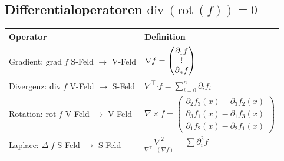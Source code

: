 \documentclass[6pt,a4paper]{scrartcl}
\let\olddot = \dot
\newcommand{\vect}[1]{\ensuremath{\begin{pmatrix} #1 \end{pmatrix}}}                            %
\newcommand{\bdot}{\ensuremath{\boldsymbol \cdot}}                                              %
\newcommand{\svdots}{\ensuremath{\olddot :}}                                                    %
\renewcommand*{\dot}[1]{\accentset{\mbox{\textrm{\large\bfseries .}} }{#1}}                     %
\renewcommand{\div}{\ensuremath{\mathrm{div}\ }}                               %
\newcommand{\rot}{\ensuremath{\mathrm{rot}\ }}                                 %
\begin{document}
\begin{multicols*}{4}
    \subsection{Differentialoperatoren \qquad $\div(\rot(f)) = 0$}
    \begin{tabular}{l|l}
        Operator & Definition                       \\ \midrule
        \pbox{2.0cm}{ Gradient: $\mathrm{grad}\; f$ \\ S-Feld $\rightarrow$ V-Feld } & $\nabla f = \vect{\partial_1 f \\ \svdots \\ \partial_n f}$ \\ \midrule
        \pbox{2.0cm}{ Divergenz: $\mathrm{div}\; f$ \\ V-Feld $\rightarrow$ S-Feld } & ${\displaystyle \nabla^\top \bdot f = \sum\limits_{i=0}^n \partial_i f_i}$\\ \midrule %
        \pbox{2.0cm}{ Rotation: $\mathrm{rot}\; f$  \\ V-Feld $\rightarrow$ V-Feld } & $\nabla \times f = \vect{\partial_2 f_3(x) - \partial_3 f_2(x) \\[2pt] \partial_3 f_1(x) -\partial_1 f_3(x) \\[2pt] \partial_1 f_2(x) -\partial_2 f_1(x) }$ \\ \midrule
        \pbox{2.0cm}{ Laplace: $\Delta\; f$         \\ S-Feld $\rightarrow$ S-Feld } & ${\displaystyle\underset{\nabla^\top \cdot (\nabla f)}{\nabla^2} = \sum \partial_i^2 f}$ %
    \end{tabular}



\end{multicols*}
\end{document}
